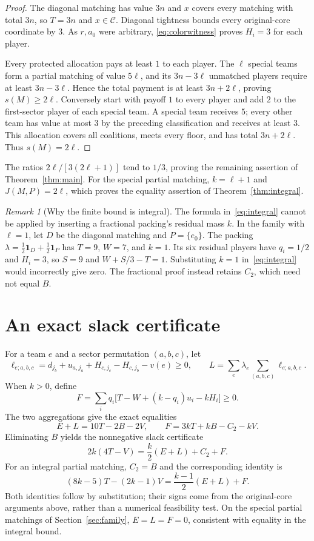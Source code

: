 \documentclass[11pt]{article}
\theoremstyle{remark}
\newtheorem{remark}[theorem]{Remark}
\newcommand{\core}{\mathcal C}
\newcommand{\one}{\mathbf 1}
\begin{document}
\begin{proof}
The diagonal matching has value $3n$ and $x$ covers every matching with
total $3n$, so $T=3n$ and $x\in\core$. Diagonal tightness bounds every
original-core coordinate by $3$. As $r,a_0$ were arbitrary,
\eqref{eq:colorwitness} proves $H_i=3$ for each player.

Every protected allocation pays at least $1$ to each player. The $\ell$
special teams form a partial matching of value $5\ell$, and its
$3n-3\ell$ unmatched players require at least $3n-3\ell$. Hence the
total payment is at least $3n+2\ell$, proving $s(M)\ge2\ell$.
Conversely start with payoff $1$ to every player and add $2$ to the
first-sector player of each special team. A special team receives $5$;
every other team has value at most $3$ by the preceding classification
and receives at least $3$. This allocation covers all coalitions, meets
every floor, and has total $3n+2\ell$. Thus $s(M)=2\ell$.
\end{proof}

The ratios $2\ell/[3(2\ell+1)]$ tend to $1/3$, proving the remaining
assertion of Theorem~\ref{thm:main}. For the special partial matching,
$k=\ell+1$ and $J(M,P)=2\ell$, which proves the equality assertion
of Theorem~\ref{thm:integral}.

\begin{remark}[Why the finite bound is integral]\label{rem:fractional}
The formula in~\eqref{eq:integral} cannot be applied by inserting a
fractional packing's residual mass $k$. In the family with $\ell=1$,
let $D$ be the diagonal matching and $P=\{e_0\}$. The packing
$\lambda=\tfrac12\one_D+\tfrac12\one_P$ has $T=9$, $W=7$, and
$k=1$. Its six residual players have $q_i=1/2$ and $H_i=3$, so $S=9$
and $W+S/3-T=1$. Substituting $k=1$ in~\eqref{eq:integral} would
incorrectly give zero. The fractional proof instead retains $C_2$,
which need not equal $B$.
\end{remark}

\section{An exact slack certificate}\label{sec:slack}
For a team $e$ and a sector permutation $(a,b,c)$, let
\[
 \ell_{e;a,b,c}
    =d_{j_b}+u_{a,j_a}+H_{c,j_c}-H_{c,j_b}-v(e)\ge0,
 \qquad
 L=\sum_e\lambda_e\sum_{(a,b,c)}\ell_{e;a,b,c}.
\]
When $k>0$, define
\[
                  F=\sum_iq_i\bigl[T-W+(k-q_i)u_i-kH_i\bigr]\ge0.
\]
The two aggregations give the exact equalities
\[
       E+L=10T-2B-2V,\qquad F=3kT+kB-C_2-kV.
\]
Eliminating $B$ yields the nonnegative slack certificate
\begin{equation}\label{eq:slack}
                 2k(4T-V)=\frac{k}{2}(E+L)+C_2+F.
\end{equation}
For an integral partial matching, $C_2=B$ and the corresponding identity is
\begin{equation}\label{eq:integralslack}
                 (8k-5)T-(2k-1)V=\frac{k-1}{2}(E+L)+F.
\end{equation}
Both identities follow by substitution; their signs come from the
original-core arguments above, rather than a numerical feasibility test.
On the special partial matchings of Section~\ref{sec:family}, $E=L=F=0$,
consistent with equality in the integral bound.
\end{document}
